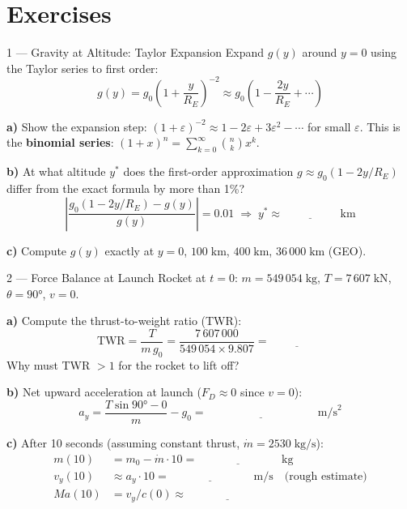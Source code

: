 \documentclass[12pt, a4paper]{article}
\begin{document}
\section{Exercises}

\begin{exercisebox}{1 — Gravity at Altitude: Taylor Expansion}
Expand $g(y)$ around $y=0$ using the Taylor series to first order:
\[
  g(y) = g_0\left(1 + \frac{y}{R_E}\right)^{-2}
  \approx g_0\left(1 - \frac{2y}{R_E} + \cdots\right)
\]

\textbf{a)} Show the expansion step: $(1+\varepsilon)^{-2} \approx 1 - 2\varepsilon + 3\varepsilon^2 - \cdots$ for small $\varepsilon$.
This is the \textbf{binomial series}: $(1+x)^n = \sum_{k=0}^\infty \binom{n}{k}x^k$.

\textbf{b)} At what altitude $y^*$ does the first-order approximation $g \approx g_0(1-2y/R_E)$ differ from the exact formula by more than 1\%?
\[
  \left|\frac{g_0(1-2y/R_E) - g(y)}{g(y)}\right| = 0.01 \;\Rightarrow\; y^* \approx \underline{\hspace{2cm}}\;\text{km}
\]

\textbf{c)} Compute $g(y)$ exactly at $y = 0$, $100\;\text{km}$, $400\;\text{km}$, $36\,000\;\text{km}$ (GEO).
\end{exercisebox}

\begin{solutionspace}[9cm]
\end{solutionspace}

\begin{exercisebox}{2 — Force Balance at Launch}
Rocket at $t=0$: $m = 549\,054\;\text{kg}$, $T = 7\,607\;\text{kN}$, $\theta = 90°$, $v=0$.

\textbf{a)} Compute the thrust-to-weight ratio (TWR):
\[
  \text{TWR} = \frac{T}{m\,g_0} = \frac{7\,607\,000}{549\,054 \times 9.807} = \underline{\hspace{2cm}}
\]
Why must TWR $> 1$ for the rocket to lift off?

\textbf{b)} Net upward acceleration at launch ($F_D \approx 0$ since $v=0$):
\[
  a_y = \frac{T\sin 90° - 0}{m} - g_0 = \underline{\hspace{4cm}}\;\text{m/s}^2
\]

\textbf{c)} After 10 seconds (assuming constant thrust, $\dot{m} = 2530\;\text{kg/s}$):
\begin{align*}
  m(10) &= m_0 - \dot{m}\cdot 10 = \underline{\hspace{3cm}}\;\text{kg}\\
  v_y(10) &\approx a_y\cdot 10 = \underline{\hspace{3cm}}\;\text{m/s} \quad \text{(rough estimate)}\\
  Ma(10) &= v_y / c(0) \approx \underline{\hspace{3cm}}
\end{align*}
\end{exercisebox}
\end{document}
